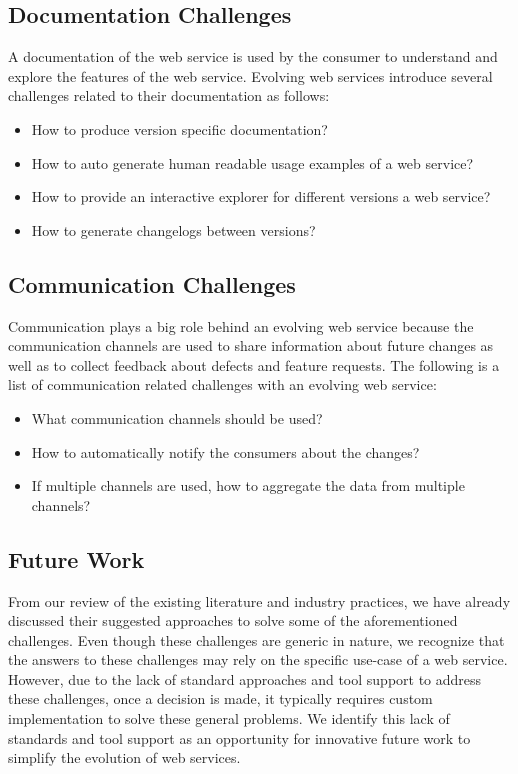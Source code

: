 \documentclass[runningheads,a4paper]{llncs}
\begin{document}
\subsection{Documentation Challenges} %
\label{ssub:documentation_challenges}
A documentation of the web service is used by the consumer to understand and explore the features of the web service. Evolving web services introduce several challenges related to their documentation as follows:
\begin{itemize}
  \item How to produce version specific documentation?
  \item How to auto generate human readable usage examples of a web service?
  \item How to provide an interactive explorer for different versions a web service?
  \item How to generate changelogs between versions?
\end{itemize}

\subsection{Communication Challenges} %
\label{sub:communication_challenges}
Communication plays a big role behind an evolving web service because the communication channels are used to share information about future changes as well as to collect feedback about defects and feature requests. The following is a list of communication related challenges with an evolving web service:
\begin{itemize}
  \item What communication channels should be used?
  \item How to automatically notify the consumers about the changes?
  \item If multiple channels are used, how to aggregate the data from multiple channels?
\end{itemize}


\subsection{Future Work} %
\label{sub:future_work}
From our review of the existing literature and industry practices, we have already discussed their suggested approaches to solve some of the aforementioned challenges. Even though these challenges are generic in nature, we recognize that the answers to these challenges may rely on the specific use-case of a web service. However, due to the lack of standard approaches and tool support to address these challenges, once a decision is made, it typically requires custom implementation to solve these general problems. We identify this lack of standards and tool support as an opportunity for innovative future work to simplify the evolution of web services.
\end{document}
